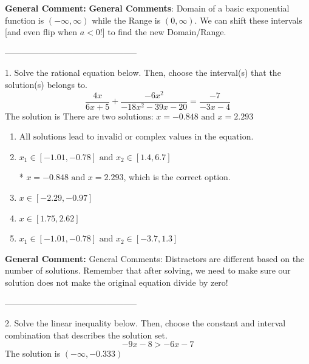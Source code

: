\documentclass{extbook}[14pt]
\begin{document}
\textbf{General Comment:} \textbf{General Comments}: Domain of a basic exponential function is $(-\infty, \infty)$ while the Range is $(0, \infty)$. We can shift these intervals [and even flip when $a<0$!] to find the new Domain/Range. 

-----------------------------------------------

1. Solve the rational equation below. Then, choose the interval(s) that the solution(s) belongs to.
\[ \frac{4x}{6x + 5} + \frac{-6x^{2}}{-18x^{2} -39 x -20} = \frac{-7}{-3x -4} \] 
The solution is $ \text{There are two solutions: } x = -0.848 \text{ and } x = 2.293 $ 

\begin{enumerate}[label=\Alph*.] 
\item $ \text{All solutions lead to invalid or complex values in the equation.} $ 

  
\item $ x_1 \in [-1.01, -0.78] \text{ and } x_2 \in [1.4,6.7] $ 

 * $x = -0.848 \text{ and } x = 2.293$, which is the correct option. 
\item $ x \in [-2.29,-0.97] $ 

  
\item $ x \in [1.75,2.62] $ 

  
\item $ x_1 \in [-1.01, -0.78] \text{ and } x_2 \in [-3.7,1.3] $ 

  
\end{enumerate} 
 
\textbf{General Comment:} General Comments: Distractors are different based on the number of solutions. Remember that after solving, we need to make sure our solution does not make the original equation divide by zero! 

-----------------------------------------------

2. Solve the linear inequality below. Then, choose the constant and interval combination that describes the solution set.
\[ -9x -8 > -6x -7 \] 
The solution is $ (-\infty, -0.333) $ 
\end{document}
